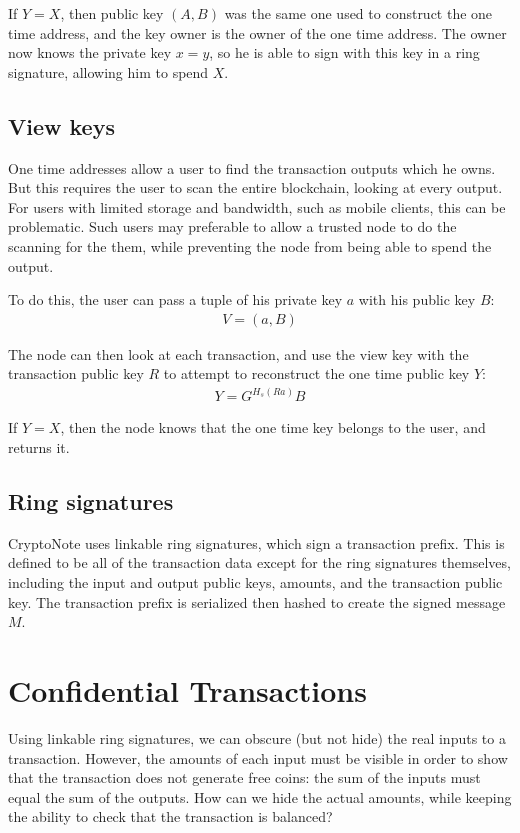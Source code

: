 \documentclass{article}
\begin{document}
If $Y = X$, then public key $(A, B)$ was the same one used to construct the one time address, and the key owner is the owner of the one time address.  The owner now knows the private key $x = y$, so he is able to sign with this key in a ring signature, allowing him to spend $X$.


\subsection{View keys}

One time addresses allow a user to find the transaction outputs which he owns.  But this requires the user to scan the entire blockchain, looking at every output.  For users with limited storage and bandwidth, such as mobile clients, this can be problematic.  Such users may preferable to allow a trusted node to do the scanning for the them, while preventing the node from being able to spend the output.

To do this, the user can pass a tuple of his private key $a$ with his public key $B$:
\begin{align}
  V = (a, B)
\end{align}

The node can then look at each transaction, and use the view key with the transaction public key $R$ to attempt to reconstruct the one time public key $Y$:
\begin{align}
  Y = G^{H_s(Ra)} B
\end{align}

If $Y = X$, then the node knows that the one time key belongs to the user, and returns it.


\subsection{Ring signatures}

CryptoNote uses linkable ring signatures, which sign a transaction prefix.  This is defined to be all of the transaction data except for the ring signatures themselves, including the input and output public keys, amounts, and the transaction public key.  The transaction prefix is serialized then hashed to create the signed message $M$.


\section{Confidential Transactions}

Using linkable ring signatures, we can obscure (but not hide) the real inputs to a transaction.  However, the amounts of each input must be visible in order to show that the transaction does not generate free coins: the sum of the inputs must equal the sum of the outputs.  How can we hide the actual amounts, while keeping the ability to check that the transaction is balanced?
\end{document}
